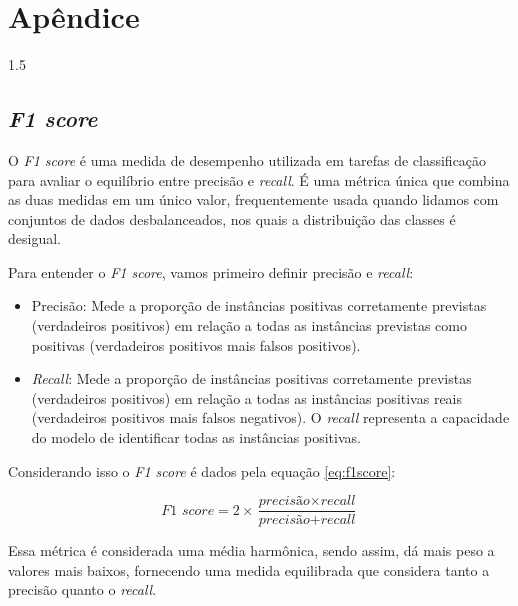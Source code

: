 \documentclass[a4paper,12pt,openright,oneside]{book}
\newenvironment{myenv}[1]
  {\begin{spacing}{#1}}
  {\end{spacing}}
\begin{document}
	\chapter{Apêndice}
	\label{ch:apendice}
	\begin{myenv}{1.5}
		\section{\textit{F1 score}}
		\label{sec:f1scoresec}
		\par O \textit{F1 score} é uma medida de desempenho utilizada em tarefas de classificação para avaliar o equilíbrio entre precisão e \textit{recall}. É uma métrica única que combina as duas medidas em um único valor, frequentemente usada quando lidamos com conjuntos de dados desbalanceados, nos quais a distribuição das classes é desigual.
		
		\par Para entender o \textit{F1 score}, vamos primeiro definir precisão e \textit{recall}:
		
		\begin{itemize}
			\item Precisão: Mede a proporção de instâncias positivas corretamente previstas (verdadeiros positivos) em relação a todas as instâncias previstas como positivas (verdadeiros positivos mais falsos positivos).
			
			\item \textit{Recall}: Mede a proporção de instâncias positivas corretamente previstas (verdadeiros positivos) em relação a todas as instâncias positivas reais (verdadeiros positivos mais falsos negativos). O \textit{recall} representa a capacidade do modelo de identificar todas as instâncias positivas.
		\end{itemize}
		
		\par Considerando isso o \textit{F1 score} é dados pela equação \ref{eq:f1score}:
		
		\begin{equation}
			\label{eq:f1score}
			\textit{F1 score} = 2 \times \frac{\textit{precisão} \times \textit{recall}}{\textit{precisão} + 	\textit{recall}}
		\end{equation}
		
		\par Essa métrica é considerada uma média harmônica, sendo assim, dá mais peso a valores mais baixos, fornecendo uma medida equilibrada que considera tanto a precisão quanto o \textit{recall}.
	\end{myenv}














	
	
\end{document}
